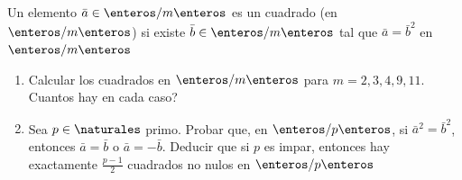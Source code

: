 \begin{enunciado}{\ejercicio}
  Un elemento $\bar{a} \in \enteros/m\enteros$ es un cuadrado (en $\enteros/m\enteros$) si existe
  $\bar{b} \in \enteros/m\enteros$ tal que $\bar{a} = \bar{b}^2$ en $\enteros/m\enteros$

  \begin{enumerate}[label=\roman*)]
    \item Calcular los cuadrados en $\enteros/m\enteros$ para $m = 2, 3, 4, 9, 11$. Cuantos hay en cada caso?

    \item Sea $p \in \naturales$ primo. Probar que, en  $\enteros/p\enteros$, si $\bar{a}^2 = \bar{b}^2$,
          entonces $\bar{a} = \bar{b}$ o $\bar{a} = -\bar{b}$. Deducir que si $p$ es impar, entonces
          hay exactamente $\frac{p-1}{2}$ cuadrados no nulos en $\enteros/p\enteros$
  \end{enumerate}
\end{enunciado}

